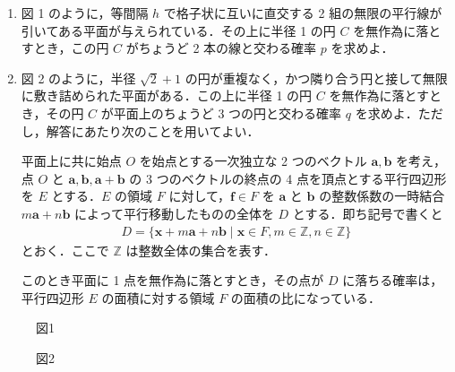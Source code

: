 \begin{enumerate}
  \item 図 1 のように，等間隔 $h$ で格子状に互いに直交する 2 組の無限の平行線が引いてある平面が与えられている．その上に半径 1 の円 $C$ を無作為に落とすとき，この円 $C$ がちょうど 2 本の線と交わる確率 $p$ を求めよ．
  \item 図 2 のように，半径 $\sqrt{2} + 1$ の円が重複なく，かつ隣り合う円と接して無限に敷き詰められた平面がある．この上に半径 1 の円 $C$ を無作為に落とすとき，その円 $C$ が平面上のちょうど 3 つの円と交わる確率 $q$ を求めよ．ただし，解答にあたり次のことを用いてよい．

        平面上に共に始点 $O$ を始点とする一次独立な 2 つのベクトル $\mathbf{a}, \mathbf{b}$ を考え，点 $O$ と $\mathbf{a}, \mathbf{b}, \mathbf{a} + \mathbf{b}$ の 3 つのベクトルの終点の 4 点を頂点とする平行四辺形を $E$ とする．$E$ の領域 $F$ に対して，$\mathbf{f} \in F$ を $\mathbf{a}$ と $\mathbf{b}$ の整数係数の一時結合 $m\mathbf{a} + n\mathbf{b}$ によって平行移動したものの全体を $D$ とする．即ち記号で書くと
        \begin{align}
          D = \{\mathbf{x} + m\mathbf{a} + n\mathbf{b} \mid \mathbf{x} \in F, m \in \mathbb{Z}, n \in \mathbb{Z} \}
        \end{align}
        とおく．ここで $\mathbb{Z}$ は整数全体の集合を表す．

        このとき平面に 1 点を無作為に落とすとき，その点が $D$ に落ちる確率は，平行四辺形 $E$ の面積に対する領域 $F$ の面積の比になっている．
\end{enumerate}

\begin{figure}[H]
  \centering
  \caption{図1}
\end{figure}

\begin{figure}[H]
  \centering
  \caption{図2}

\end{figure}